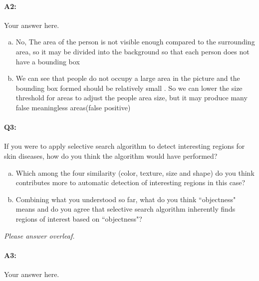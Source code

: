 \paragraph{A2:} Your answer here.

 \begin{enumerate}[(a)]

 \item No, The area of the person is not visible enough compared to the surrounding area, so it may be divided into the background so that each person does not have a bounding box

 \item We can see that people do not occupy a large area in the picture and the bounding box formed should be relatively small . So we can lower the size threshold for areas to adjust the people area size, but it may produce many false meaningless areas(false positive)

 \end{enumerate}




\pagebreak
\paragraph{Q3:}
If you were to apply selective search algorithm to detect interesting regions for skin diseases, how do you think the algorithm would have performed? 

\begin{enumerate}[(a)]
\item Which among the four similarity (color, texture, size and shape) do you think contributes more to automatic detection of interesting regions in this case?

\item Combining what you understood so far, what do you think ``objectness" means and do you agree that selective search algorithm inherently finds regions of interest based on ``objectness"?

\end{enumerate}

\emph{Please answer overleaf.}

\pagebreak
\paragraph{A3:} Your answer here.

